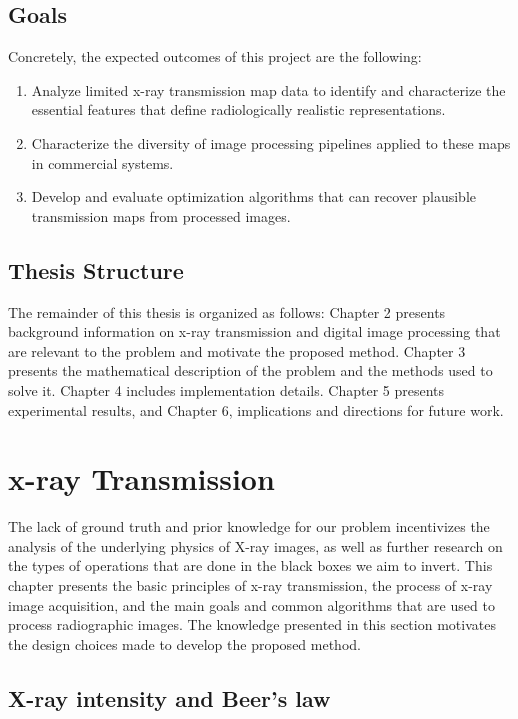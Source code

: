 \documentclass[nomenclature, english, bibtex]{kththesis}
\numberwithin{listing}{chapter}
\begin{document}
\section{Goals}

Concretely, the expected outcomes of this project are the following:

\begin{enumerate}
    \item Analyze limited x-ray transmission map data to identify and characterize the essential features that define
    radiologically realistic representations.
    \item Characterize the diversity of image processing pipelines applied to these maps in commercial systems.
    \item Develop and evaluate optimization algorithms that can recover plausible transmission maps from processed images.
\end{enumerate}

\section{Thesis Structure}

The remainder of this thesis is organized as follows: Chapter 2 presents background information on x-ray transmission and
digital image processing that are relevant to the problem and motivate the proposed method. Chapter 3
presents the mathematical description of the problem and the methods used to solve it. Chapter 4 includes implementation
details. Chapter 5 presents experimental results, and Chapter 6, implications
and directions for future work.

\chapter{x-ray Transmission}
\label{sec:xrayTransmissionModel}

The lack of ground truth and prior knowledge for our problem incentivizes the analysis of the underlying
physics of X-ray images, as well as further research on the types of operations that are done in the black boxes
we aim to invert. This chapter presents the basic principles of x-ray transmission, the process of x-ray image
acquisition, and the main goals and common algorithms that are used to process radiographic images. The
knowledge presented in this section motivates the design choices made to develop the proposed method.

\section{X-ray intensity and Beer's law}
\end{document}

